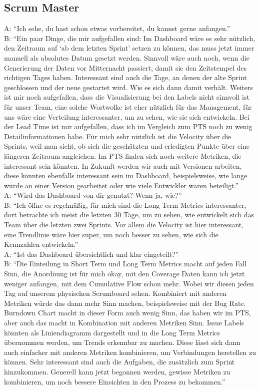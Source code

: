 \subsection{Scrum Master}

A\@: ``Ich sehe, du hast schon etwas vorbereitet, du kannst gerne anfangen.'' \\
B\@: ``Ein paar Dinge, die mir aufgefallen sind: Im Dashboard wäre es sehr nützlich, den Zeitraum auf `ab dem letzten Sprint' setzen zu können, das muss jetzt immer manuell als absolutes Datum gesetzt werden. Sinnvoll wäre auch noch, wenn die Generierung der Daten vor Mitternacht passiert, damit sie den Zeitstempel des richtigen Tages haben. Interessant sind auch die Tage, an denen der alte Sprint geschlossen und der neue gestartet wird. Wie es sich dann damit verhält. Weiters ist mir noch aufgefallen, dass die Visualisierung bei den Labels nicht sinnvoll ist für unser Team, eine solche Wortwolke ist eher nützlich für das Management, für uns wäre eine Verteilung interessanter, um zu sehen, wie sie sich entwickeln. Bei der Lead Time ist mir aufgefallen, dass ich im Vergleich zum \ac{PTS} noch zu wenig Detailinformationen habe. Für mich sehr nützlich ist die Velocity über die Sprints, weil man sieht, ob sich die geschätzten und erledigten Punkte über eine längeren Zeitraum angleichen. Im \ac{PTS} finden sich noch weitere Metriken, die interessant sein könnten. In Zukunft werden wir auch mit Versionen arbeiten, diese könnten ebenfalls interessant sein im Dashboard, beispielsweise, wie lange wurde an einer Version gearbeitet oder wie viele Entwickler waren beteiligt.'' \\
A\@: ``Wird das Dashboard von dir genutzt? Wenn ja, wie?'' \\
B\@: ``Ich öffne es regelmäßig, für mich sind die Long Term Metrics interessanter, dort betrachte ich meist die letzten 30 Tage, um zu sehen, wie entwickelt sich das Team über die letzten zwei Sprints. Vor allem die Velocity ist hier interessant, eine Trendlinie wäre hier super, um noch besser zu sehen, wie sich die Kennzahlen entwickeln.'' \\
A\@: ``Ist das Dashboard übersichtlich und klar eingeteilt?'' \\
B\@: ``Die Einteilung in Short Term und Long Term Metrics macht auf jeden Fall Sinn, die Anordnung ist für mich okay, mit den Coverage Daten kann ich jetzt weniger anfangen, mit dem Cumulative Flow schon mehr. Wobei wir diesen jeden Tag auf unserem physischen Scrumboard sehen. Kombiniert mit anderen Metriken würde das dann mehr Sinn machen, beispielsweise mit der Bug Rate. Burndown Chart macht in dieser Form auch wenig Sinn, das haben wir im \ac{PTS}, aber auch das macht in Kombination mit anderen Metriken Sinn. Issue Labels könnten als Liniendiagramm dargestellt und in die Long Term Metrics übernommen werden, um Trends erkennbar zu machen. Diese lässt sich dann auch einfacher mit anderen Metriken kombinieren, um Verbindungen herstellen zu können. Sehr interessant sind auch die Aufgaben, die zusätzlich zum Sprint hinzukommen. Generell kann jetzt begonnen werden, gewisse Metriken zu kombinieren, um noch bessere Einsichten in den Prozess zu bekommen.'' \\
